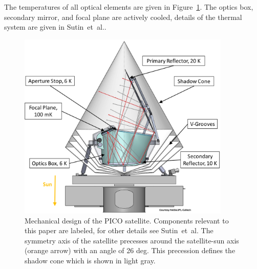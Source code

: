 \documentclass[]{spie}  %
\newcommand{\comb}[1]{\textcolor{blue}{#1}}
\begin{document}
The temperatures of all optical elements are given in Figure~\ref{fig:cad}. 
The optics box, secondary mirror, and focal plane are actively cooled, 
details of the thermal system are given in Sutin~et~al.\cite{brian_spie}. 

\begin{figure} [ht]
\begin{center}
\includegraphics[height=9cm]{PICO_CAD_annotated.png}
\end{center}
\caption { \label{fig:cad} 
Mechanical design of the PICO satellite. Components relevant to this paper are labeled, for other details see Sutin~et~al.\cite{brian_spie}
The symmetry axis of the satellite precesses around the satellite-sun axis (orange arrow) with an angle of 26 deg. This precession defines the 
shadow cone which is shown in light gray.
}
\end{figure} 

\end{document}
